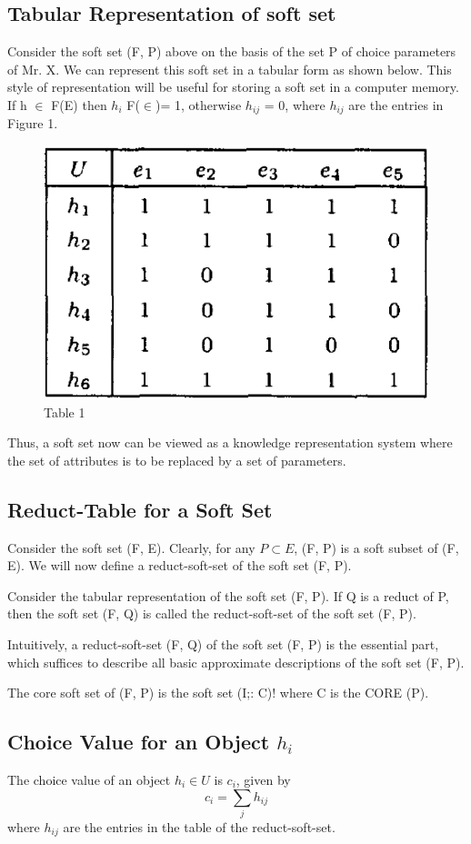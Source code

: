 \documentclass[12pt]{article} %
\begin{document}
\subsection{Tabular Representation of soft set}
Consider the soft set (F, P) above on the basis of the set P of choice parameters of Mr. X. We can represent this soft set in
a tabular form as shown below. This style of representation will be useful for storing a soft set
in a computer memory. If h $\in$ F(E) then $h_i$ F($\in$)= 1, otherwise $h_{ij}$ = 0, where $h_{ij}$ are the entries in Figure 1.
\begin{figure}[h!]
  \centering
   \includegraphics[scale=0.50]{table_1.png}
  \caption{Table 1}
\end{figure}
Thus, a soft set now can be viewed as a knowledge representation system where the set of attributes is to be replaced by a set of parameters.

\subsection{Reduct-Table for a Soft Set}
Consider the soft set (F, E). Clearly, for any $P \subset E$, (F, P) is a soft subset of (F, E). We will now define a reduct-soft-set of the soft set (F, P).

Consider the tabular representation of the soft set (F, P). If Q is a reduct of P, then the soft set (F, Q) is called the reduct-soft-set of the soft set (F, P).


Intuitively, a reduct-soft-set (F, Q) of the soft set (F, P) is the essential part, which suffices to
describe all basic approximate descriptions of the soft set (F, P).


The core soft set of (F, P) is the soft set (I;: C)! where C is the CORE (P).
\subsection{Choice Value for an Object $h_i$}
The choice value of an object $h_i \in U $ is $c_i$, given by
$$c_i = \sum_{j} h_{ij}$$
where $h_{ij}$ are the entries in the table of the reduct-soft-set.
\end{document}
